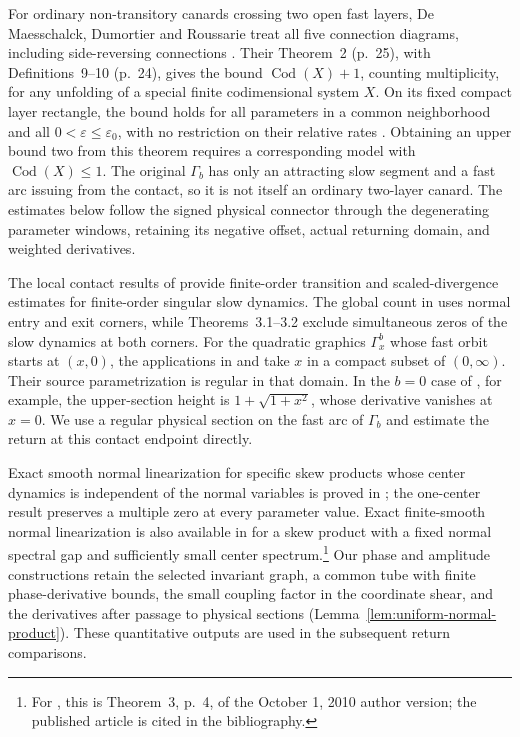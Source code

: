 For ordinary non-transitory canards crossing two open fast layers,
De Maesschalck, Dumortier and Roussarie treat all five connection
diagrams, including side-reversing connections \cite{DMR2025TwoLayer}.
Their Theorem~2 (p.~25), with Definitions~9--10 (p.~24), gives the bound
$\operatorname{Cod}(X)+1$, counting multiplicity, for any unfolding of a
special finite codimensional system $X$.
On its fixed compact layer rectangle, the bound holds for all parameters
in a common neighborhood and all $0<\varepsilon\le\varepsilon_0$, with
no restriction on their relative rates
\cite[proof of Theorem~2, Claim, p.~27]{DMR2025TwoLayer}.
Obtaining an upper bound two from this theorem requires a corresponding
model with $\operatorname{Cod}(X)\le1$.
The original $\Gamma_b$ has only an attracting slow segment and a fast
arc issuing from the contact, so it is not itself an ordinary two-layer
canard. The estimates below follow the signed physical connector
through the degenerating parameter windows, retaining its negative
offset, actual returning domain, and weighted derivatives.

The local contact results of \cite{DMD2010,DMD2011Detectable} provide
finite-order transition and scaled-divergence estimates for finite-order
singular slow dynamics. The global count in
\cite[Theorem~2.7]{DMD2011Detectable} uses normal entry and exit
corners, while Theorems~3.1--3.2 exclude simultaneous zeros of the
slow dynamics at both corners. For the quadratic graphics
$\Gamma_x^b$ whose fast orbit starts at $(x,0)$, the applications in
\cite[Theorem~7]{DMD2010} and
\cite[Theorems~1.1--1.2]{Huzak2018} take $x$ in a compact subset
of $(0,\infty)$. Their source parametrization is regular in that
domain. In the $b=0$ case of \cite{Huzak2018}, for example, the
upper-section height is $1+\sqrt{1+x^2}$, whose derivative vanishes
at $x=0$. We use a regular physical section on the fast arc of
$\Gamma_b$ and estimate the return at this contact endpoint directly.

\enlargethispage{2pt}
Exact smooth normal linearization for specific skew products whose
center dynamics is independent of the normal variables is proved in
\cite[Theorems~1.1 and~1.3, pp.~41--42]{DR2010Normal}; the one-center
result preserves a multiple zero at every parameter value.
Exact finite-smooth normal linearization is also available in
\cite[Theorem~3]{BDMD2011Normal} for a skew product with a fixed
normal spectral gap and sufficiently small center spectrum.\footnote{For \cite{BDMD2011Normal}, this is
Theorem~3, p.~4, of the October 1, 2010 author version; the published
article is cited in the bibliography.}
Our phase and amplitude constructions retain the selected invariant
graph, a common tube with finite phase-derivative bounds, the small
coupling factor in the coordinate shear, and the derivatives after
passage to physical sections
(Lemma~\ref{lem:uniform-normal-product}). These quantitative outputs
are used in the subsequent return comparisons.

